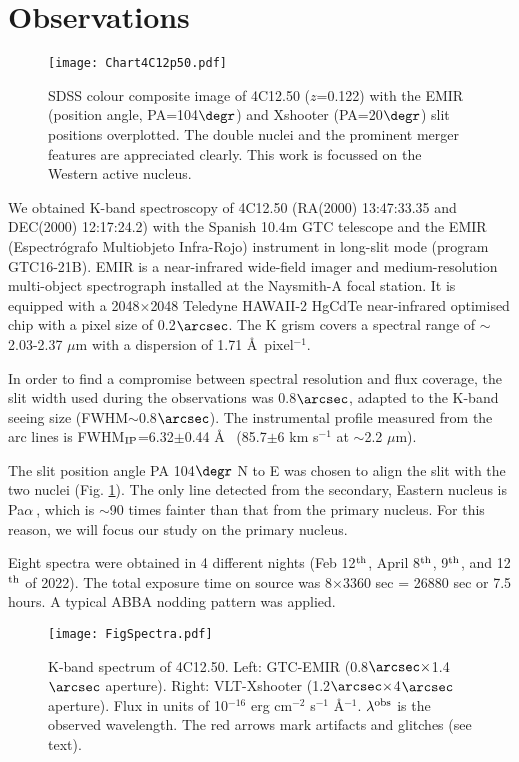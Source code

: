 \documentclass{aa}
\newcommand{\pa}{Pa$\alpha~$}
\begin{document}
\section{Observations}
\label{sec-obs}

\begin{figure}
\centering
\texttt{[image: Chart4C12p50.pdf]}
\caption{SDSS colour composite image of 4C12.50 ($z$=0.122) with the EMIR (position angle, PA=104$\degr$) and Xshooter (PA=20$\degr$) slit positions overplotted. The double nuclei and the prominent merger features are  appreciated clearly. This work is focussed on  the Western active nucleus.}
\label{im1347}
\end{figure}

We obtained K-band spectroscopy of 4C12.50  (RA(2000) 13:47:33.35 and DEC(2000) 12:17:24.2) with the Spanish 10.4m GTC telescope and the EMIR (Espectr\'ografo  Multiobjeto Infra-Rojo)  instrument in long-slit mode (program GTC16-21B). EMIR is a near-infrared 
wide-field imager and medium-resolution multi-object spectrograph installed at the Naysmith-A focal station. It is equipped with a 2048$\times$2048 Teledyne HAWAII-2 HgCdTe   near-infrared optimised  chip with a pixel size of 0.2$\arcsec$. The K  grism covers a spectral range of  $\sim$2.03-2.37 $\mu$m   with a dispersion of 1.71 \AA\  pixel$^{-1}$. 


In order to find a compromise between spectral resolution and flux coverage, the slit width used during the observations was 0.8$\arcsec$, adapted to the  K-band  seeing size  (FWHM$\sim$0.8$\arcsec$).  The instrumental profile measured from the arc lines is FWHM$_{\rm IP}$=6.32$\pm$0.44 \AA~ (85.7$\pm$6 km s$^{-1}$ at $\sim$2.2 $\mu$m).  

The slit position angle PA 104$\degr$ N to E was chosen to align the slit with the two  nuclei (Fig. \ref{im1347}). The only line detected from the  secondary, Eastern nucleus is \pa, which is $\sim$90 times fainter than that from the primary nucleus.  For this reason, we will focus our study on the primary nucleus.

Eight spectra were obtained in 4 different nights (Feb 12$^{\rm th}$, April 8$^{\rm th}$, 9$^{\rm th}$,  and 12$^{\rm th}$ of 2022).   The total exposure time on source was 8$\times$3360 sec = 26880 sec or 7.5 hours.  A typical ABBA nodding pattern was applied. 

\begin{figure*}
\centering
\texttt{[image: FigSpectra.pdf]}
\caption{K-band spectrum of 4C12.50. Left: GTC-EMIR (0.8$\arcsec\times$1.4$\arcsec$ aperture). Right: VLT-Xshooter (1.2$\arcsec\times$4$\arcsec$ aperture).  Flux  in units of 10$^{-16}$ erg cm$^{-2}$ s$^{-1}$ \AA$^{-1}$. $\lambda^{\rm obs}$ is the observed wavelength. The red arrows mark artifacts and glitches (see text).}
\label{spectra}
\end{figure*}
\end{document}

